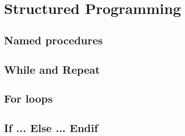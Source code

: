 \chapter{Structured Programming}

\section{Named procedures}

\section{While and Repeat}

\section{For loops }

\section{If ... Else ... Endif}

